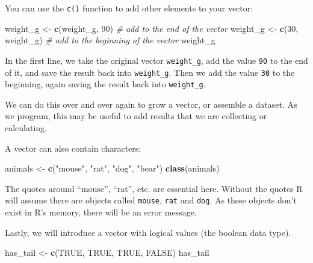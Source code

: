 \documentclass[]{book}
\newenvironment{Shaded}{\begin{snugshade}}{\end{snugshade}}
\newcommand{\KeywordTok}[1]{\textcolor[rgb]{0.13,0.29,0.53}{\textbf{#1}}}
\newcommand{\DecValTok}[1]{\textcolor[rgb]{0.00,0.00,0.81}{#1}}
\newcommand{\StringTok}[1]{\textcolor[rgb]{0.31,0.60,0.02}{#1}}
\newcommand{\CommentTok}[1]{\textcolor[rgb]{0.56,0.35,0.01}{\textit{#1}}}
\newcommand{\OtherTok}[1]{\textcolor[rgb]{0.56,0.35,0.01}{#1}}
\newcommand{\NormalTok}[1]{#1}
\theoremstyle{definition}
\theoremstyle{definition}
\theoremstyle{definition}
\theoremstyle{remark}
\begin{document}
You can use the \texttt{c()} function to add other elements to your
vector:

\begin{Shaded}
\begin{Highlighting}[]
\NormalTok{weight_g <-}\StringTok{ }\KeywordTok{c}\NormalTok{(weight_g, }\DecValTok{90}\NormalTok{) }\CommentTok{# add to the end of the vector}
\NormalTok{weight_g <-}\StringTok{ }\KeywordTok{c}\NormalTok{(}\DecValTok{30}\NormalTok{, weight_g) }\CommentTok{# add to the beginning of the vector}
\NormalTok{weight_g}
\end{Highlighting}
\end{Shaded}

In the first line, we take the original vector \texttt{weight\_g}, add
the value \texttt{90} to the end of it, and save the result back into
\texttt{weight\_g}. Then we add the value \texttt{30} to the beginning,
again saving the result back into \texttt{weight\_g}.

We can do this over and over again to grow a vector, or assemble a
dataset. As we program, this may be useful to add results that we are
collecting or calculating.

A vector can also contain characters:

\begin{Shaded}
\begin{Highlighting}[]
\NormalTok{animals <-}\StringTok{ }\KeywordTok{c}\NormalTok{(}\StringTok{"mouse"}\NormalTok{, }\StringTok{"rat"}\NormalTok{, }\StringTok{"dog"}\NormalTok{, }\StringTok{"bear"}\NormalTok{)}
\KeywordTok{class}\NormalTok{(animals)}
\end{Highlighting}
\end{Shaded}

The quotes around ``mouse'', ``rat'', etc. are essential here. Without
the quotes R will assume there are objects called \texttt{mouse},
\texttt{rat} and \texttt{dog}. As these objects don't exist in R's
memory, there will be an error message.

Lastly, we will introduce a vector with logical values (the boolean data
type).

\begin{Shaded}
\begin{Highlighting}[]
\NormalTok{has_tail <-}\StringTok{ }\KeywordTok{c}\NormalTok{(}\OtherTok{TRUE}\NormalTok{, }\OtherTok{TRUE}\NormalTok{, }\OtherTok{TRUE}\NormalTok{, }\OtherTok{FALSE}\NormalTok{)}
\NormalTok{has_tail }
\end{Highlighting}
\end{Shaded}
\end{document}
